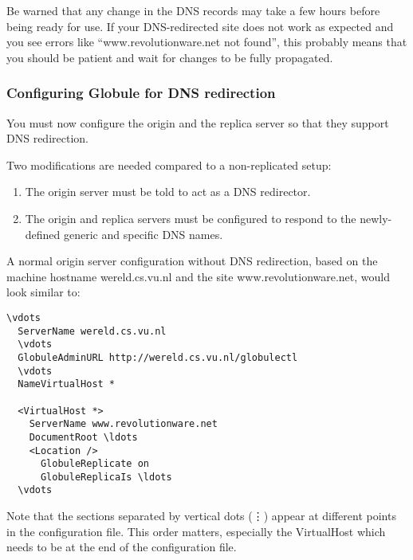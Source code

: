 \documentclass[10pt,a4paper]{article}
\makeatletter
\newenvironment{p}{\@open{P}{}}{\@close{P}}
\newenvironment{p}{}{\par}
\makeatother
\begin{document}
\begin{p}
Be warned that any change in the DNS records may take a few hours before being
ready for use.  If your DNS-redirected site does not work as expected and you
see errors like ``www.revolutionware.net not found'', this probably means that
you should be patient and wait for changes to be fully propagated.
\end{p}

\subsubsection{Configuring Globule for DNS redirection}

\begin{p}
You must now configure the origin and the replica server so that they support
DNS redirection.
\end{p}

\begin{p}
Two modifications are needed compared to a non-replicated setup:
\begin{enumerate}
\item The origin server must be told to act as a DNS redirector.
\item The origin and replica servers must be configured to respond to the
  newly-defined generic and specific DNS names.
\end{enumerate}
\end{p}

\begin{p}
A normal origin server configuration without DNS redirection, based on the
machine hostname wereld.cs.vu.nl and the site www.revolutionware.net, would
look similar to:
\end{p}

\begin{Verbatim}[label=Original origin server's configuration]
  \vdots
  ServerName wereld.cs.vu.nl
  \vdots
  GlobuleAdminURL http://wereld.cs.vu.nl/globulectl
  \vdots
  NameVirtualHost *

  <VirtualHost *>
    ServerName www.revolutionware.net
    DocumentRoot \ldots
    <Location />
      GlobuleReplicate on
      GlobuleReplicaIs \ldots
  \vdots
\end{Verbatim}

\begin{p}
Note that the sections separated by vertical dots (\vdots) appear at different
points in the configuration file. This order matters, especially the
VirtualHost which needs to be at the end of the configuration file.
\end{p}
\end{document}
